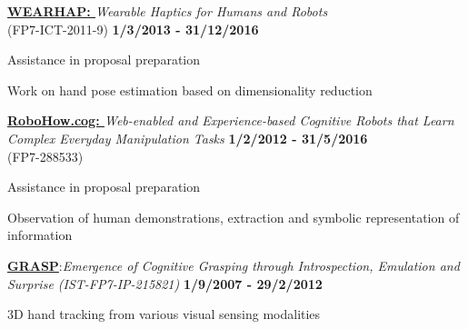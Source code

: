 \documentclass[10pt]{article}
\newenvironment{outerlist}[1][\enskip\textbullet]%
        {\begin{itemize}[#1]}{\end{itemize}%
         \vspace{-.6\baselineskip}}
\newenvironment{innerlist}[1][\enskip\textbullet]%
        {\begin{compactitem}[#1]}{\end{compactitem}}
\begin{document}
\begin{outerlist}
        \item[] {\bf \href{http://www.wearhap.eu/}{WEARHAP: }}\textit{Wearable Haptics for Humans and Robots} \\ (FP7-ICT-2011-9) \hfill \textbf{1/3/2013 - 31/12/2016}
        \begin{innerlist}
            \item Assistance in proposal preparation
            \item Work on hand pose estimation based on dimensionality reduction
        \end{innerlist}
        
        \item[] {\bf \href{http://robohow.eu/}{RoboHow.cog: }}\textit{Web-enabled and Experience-based Cognitive Robots that Learn
Complex Everyday Manipulation Tasks } \hfill \textbf{1/2/2012 - 31/5/2016}\\ (FP7-288533)
        \begin{innerlist}
            \item Assistance in proposal preparation
            \item Observation of human demonstrations, extraction and symbolic representation of information
        \end{innerlist}
        
                \item[] \textbf{\href{http://www.grasp-project.eu/}{GRASP}}:\textit{Emergence of Cognitive Grasping through Introspection, Emulation and Surprise (IST-FP7-IP-215821)} \hfill \textbf{1/9/2007 - 29/2/2012}
        \begin{innerlist}
                \item 3D hand tracking from various visual sensing modalities
        \end{innerlist}
        

\end{outerlist}
\end{document}
